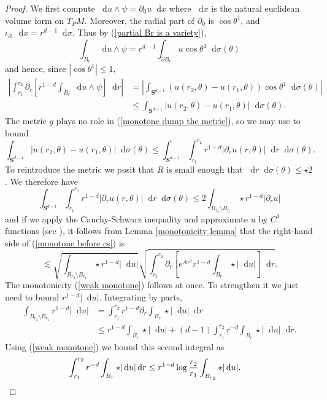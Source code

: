 \documentclass[reqno,10pt]{amsart}
\newcommand{\Sph}{\mathbf S}
\newcommand*\dif{\mathop{}\!\mathrm{d}}
\theoremstyle{definition}
\numberwithin{equation}{section}
\begin{document}
\begin{proof}
We first compute $\dif u \wedge \psi = \partial_0 u \dif x$
where $\dif x$ is the natural euclidean volume form on $T_PM$.
Moreover, the radial part of $\partial_0$ is $\cos \theta^1$, and $\iota_{\partial_r} \dif x = r^{d - 1} \dif \sigma$.
Thus by (\ref{partial Br is a variety}),
$$\int_{B_r} \dif u \wedge \psi = r^{d - 1}\int_{\partial B_r} u \cos \theta^1 \dif \sigma(\theta)$$
and hence, since $|\cos \theta^1| \leq 1$,
\begin{align}
\left|\int_{r_1}^{r_2} \partial_r \left[r^{1 - d}\int_{B_r} \dif u \wedge \psi\right] \dif r\right|
&= \left|\int_{\Sph^{d - 1}} (u(r_2, \theta) - u(r_1, \theta)) \cos \theta^1 \dif \sigma(\theta)\right| \\
&\leq \int_{\Sph^{d - 1}} |u(r_2, \theta) - u(r_1, \theta)| \dif \sigma(\theta). \label{monotone dump the metric}
\end{align}
The metric $g$ plays no role in (\ref{monotone dump the metric}), so we may use \cite[Lemma 5.3]{Giusti77} to bound
$$\int_{\Sph^{d - 1}} |u(r_2, \theta) - u(r_1, \theta)| \dif \sigma(\theta) \leq \int_{\Sph^{d - 1}} \int_{r_1}^{r_2} r^{1 - d}|\partial_r u(r, \theta)| \dif r \dif\sigma(\theta).$$
To reintroduce the metric we posit that $R$ is small enough that $\dif r \dif \sigma(\theta) \leq \star 2$.
We therefore have
\begin{equation}\label{monotone before cs}
\int_{\Sph^{d - 1}} \int_{r_1}^{r_2} r^{1 - d}|\partial_r u(r, \theta)| \dif r \dif\sigma(\theta) \leq 2 \int_{B_{r_2} \setminus B_{r_1}} \star r^{1 - d}|\partial_r u|
\end{equation}
and if we apply the Cauchy-Schwarz inequality and approximate $u$ by $C^1$ functions (see \cite[pg68]{Giusti77}), it follows from Lemma \ref{monotonicity lemma} that the right-hand side of (\ref{monotone before cs}) is
$$\lesssim \sqrt{\int_{B_{r_2} \setminus B_{r_1}} \star r^{1 - d} |\dif u|} \sqrt{\int_{r_1}^{r_2} \partial_r \left[e^{Ar^2} r^{1-d}\int_{B_r} \star |\dif u|\right] \dif r}.$$
The monotonicity (\ref{weak monotone}) follows at once. To strengthen it we just need to bound $r^{1 - d} |\dif u|$.
Integrating by parts,
\begin{align*}
\int_{B_{r_2} \setminus B_{r_1}} r^{1 - d} |\dif u| &= \int_{r_1}^{r_2} r^{1 - d} \partial_r \int_{B_r} \star |\dif u| \dif r \\
&\leq r^{1 - d} \int_{B_r} \star |\dif u| + (d - 1) \int_{r_1}^{r_2} r^{-d} \int_{B_r} \star |\dif u| \dif r.
\end{align*}
Using (\ref{weak monotone}) we bound this second integral as
\begin{align*}
\int_{r_1}^{r_2} r^{-d} \int_{B_r} \star |\dif u| \dif r &\leq r^{1 - d} \log \frac{r_2}{r_1} \int_{B_{r_2}} \star |\dif u|. \qedhere
\end{align*}
\end{proof}
\end{document}

